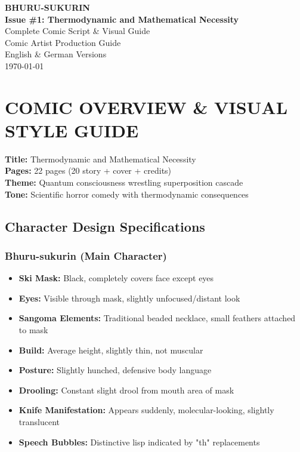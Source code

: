 \documentclass[12pt,a4paper]{article}
\begin{document}
\begin{titlepage}
\centering
\vspace*{2cm}
{\Huge\bfseries\color{darkblue} BHURU-SUKURIN}\\[0.5cm]
{\Large\bfseries Issue \#1: Thermodynamic and Mathematical Necessity}\\[1cm]
{\large Complete Comic Script \& Visual Guide}\\[2cm]
\vfill
{\large Comic Artist Production Guide}\\
{\large English \& German Versions}\\[1cm]
{\large \today}
\end{titlepage}

\tableofcontents
\newpage


\section{COMIC OVERVIEW \& VISUAL STYLE GUIDE}

\begin{tcolorbox}[colback=lightgray,colframe=darkblue,title=\textbf{Issue Summary}]
\textbf{Title:} Thermodynamic and Mathematical Necessity\\
\textbf{Pages:} 22 pages (20 story + cover + credits)\\
\textbf{Theme:} Quantum consciousness wrestling superposition cascade\\
\textbf{Tone:} Scientific horror comedy with thermodynamic consequences
\end{tcolorbox}

\subsection{Character Design Specifications}

\subsubsection{Bhuru-sukurin (Main Character)}
\begin{itemize}
\item \textbf{Ski Mask:} Black, completely covers face except eyes
\item \textbf{Eyes:} Visible through mask, slightly unfocused/distant look
\item \textbf{Sangoma Elements:} Traditional beaded necklace, small feathers attached to mask
\item \textbf{Build:} Average height, slightly thin, not muscular
\item \textbf{Posture:} Slightly hunched, defensive body language
\item \textbf{Drooling:} Constant slight drool from mouth area of mask
\item \textbf{Knife Manifestation:} Appears suddenly, molecular-looking, slightly translucent
\item \textbf{Speech Bubbles:} Distinctive lisp indicated by "th" replacements
\end{itemize}
\end{document}
